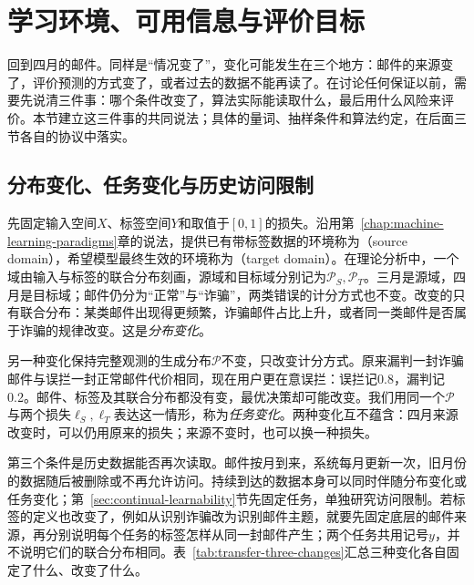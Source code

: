 \section{学习环境、可用信息与评价目标}
\label{sec:transfer-learning-setting}

回到四月的邮件。同样是“情况变了”，变化可能发生在三个地方：邮件的来源变了，评价预测的方式变了，或者过去的数据不能再读了。在讨论任何保证以前，需要先说清三件事：哪个条件改变了，算法实际能读取什么，最后用什么风险来评价。本节建立这三件事的共同说法；具体的量词、抽样条件和算法约定，在后面三节各自的协议中落实。

\subsection{分布变化、任务变化与历史访问限制}
\label{sec:transfer-change-types}

先固定输入空间$X$、标签空间$Y$和取值于$[0,1]$的损失。沿用第~\ref{chap:machine-learning-paradigms}章的说法，提供已有带标签数据的环境称为（source domain），希望模型最终生效的环境称为（target domain）。在理论分析中，一个域由输入与标签的联合分布刻画，源域和目标域分别记为$\mathcal P_S,\mathcal P_T$。三月是源域，四月是目标域；邮件仍分为“正常”与“诈骗”，两类错误的计分方式也不变。改变的只有联合分布：某类邮件出现得更频繁，诈骗邮件占比上升，或者同一类邮件是否属于诈骗的规律改变。这是\emph{分布变化}。

另一种变化保持完整观测的生成分布$\mathcal P$不变，只改变计分方式。原来漏判一封诈骗邮件与误拦一封正常邮件代价相同，现在用户更在意误拦：误拦记0.8，漏判记0.2。邮件、标签及其联合分布都没有变，最优决策却可能改变。我们用同一个$\mathcal P$与两个损失$\ell_S,\ell_T$表达这一情形，称为\emph{任务变化}。两种变化互不蕴含：四月来源改变时，可以仍用原来的损失；来源不变时，也可以换一种损失。

第三个条件是历史数据能否再次读取。邮件按月到来，系统每月更新一次，旧月份的数据随后被删除或不再允许访问。持续到达的数据本身可以同时伴随分布变化或任务变化；第~\ref{sec:continual-learnability}节先固定任务，单独研究访问限制。若标签的定义也改变了，例如从识别诈骗改为识别邮件主题，就要先固定底层的邮件来源，再分别说明每个任务的标签怎样从同一封邮件产生；两个任务共用记号$y$，并不说明它们的联合分布相同。表~\ref{tab:transfer-three-changes}汇总三种变化各自固定了什么、改变了什么。

